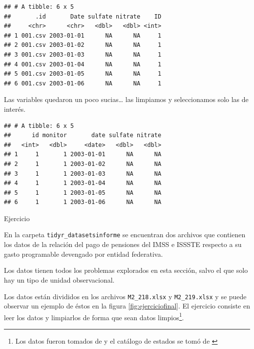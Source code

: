 \documentclass[]{article}
\newenvironment{Shaded}{\begin{snugshade}}{\end{snugshade}}
\newcommand{\KeywordTok}[1]{\textcolor[rgb]{0.13,0.29,0.53}{\textbf{#1}}}
\newcommand{\DataTypeTok}[1]{\textcolor[rgb]{0.13,0.29,0.53}{#1}}
\newcommand{\StringTok}[1]{\textcolor[rgb]{0.31,0.60,0.02}{#1}}
\newcommand{\OperatorTok}[1]{\textcolor[rgb]{0.81,0.36,0.00}{\textbf{#1}}}
\newcommand{\NormalTok}[1]{#1}
\let\rmarkdownfootnote\footnote%
\def\footnote{\protect\rmarkdownfootnote}
\begin{document}
\begin{verbatim}
## # A tibble: 6 x 5
##       .id       Date sulfate nitrate    ID
##     <chr>      <chr>   <dbl>   <dbl> <int>
## 1 001.csv 2003-01-01      NA      NA     1
## 2 001.csv 2003-01-02      NA      NA     1
## 3 001.csv 2003-01-03      NA      NA     1
## 4 001.csv 2003-01-04      NA      NA     1
## 5 001.csv 2003-01-05      NA      NA     1
## 6 001.csv 2003-01-06      NA      NA     1
\end{verbatim}

Las variables quedaron un poco sucias\ldots{} las limpiamos y
seleccionamos solo las de interés.

\begin{Shaded}
\end{Shaded}

\begin{verbatim}
## # A tibble: 6 x 5
##      id monitor       date sulfate nitrate
##   <int>   <dbl>     <date>   <dbl>   <dbl>
## 1     1       1 2003-01-01      NA      NA
## 2     1       1 2003-01-02      NA      NA
## 3     1       1 2003-01-03      NA      NA
## 4     1       1 2003-01-04      NA      NA
## 5     1       1 2003-01-05      NA      NA
## 6     1       1 2003-01-06      NA      NA
\end{verbatim}

\renewcommand\bcStyleTitre[1]{\large\textcolor{bbblack}{#1}}

\begin{bclogo}[
  couleur=llred,
  arrondi=0,
  logo=\bcstop,
  barre=none,
  noborder=true]{Ejercicio}

En la carpeta \texttt{tidyr\_datasets\/informe\/} se encuentran dos archivos que
contienen los datos de la relación del pago de pensiones del IMSS e ISSSTE respecto 
a su gasto programable devengado por entidad federativa. 

Los datos tienen todos los problemas explorados en esta sección, salvo el que 
solo hay un tipo de unidad observacional.

Los datos están divididos en los archivos \texttt{M2\_218.xlsx} y 
\texttt{M2\_219.xlsx} y se puede observar un ejemplo de éstos en la figura \ref{fig:ejerciciofinal}.
El ejercicio consiste en leer los datos y limpiarlos de forma que sean datos
limpios\footnote{Los datos fueron tomados de \textcite[][p. 218-219]{informe} y el catálogo de estados se tomó de \parencite{mgn}}.

\end{bclogo}
\end{document}
